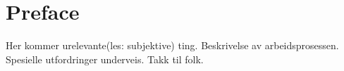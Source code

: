 \section*{Preface}
\label{preface}
Her kommer urelevante(les: subjektive) ting.
Beskrivelse av arbeidsprosessen.
Spesielle utfordringer underveis.
Takk til folk.